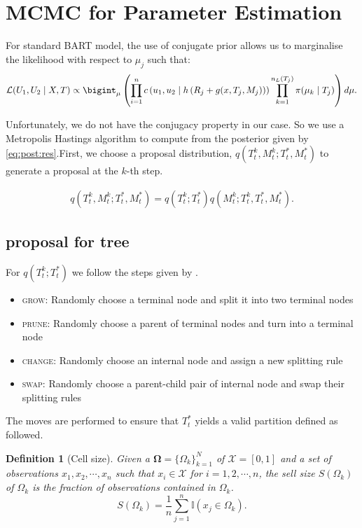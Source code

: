 \documentclass{amsart}
\newtheorem{definition}{Definition}[section]
\begin{document}
\section{MCMC for Parameter Estimation}
For standard BART model, the use of conjugate prior allows us to marginalise the likelihood with respect to $\mu_j$ such that:
\begin{equation}
	\mathcal{L}(U_1,U_2\mid X, T)\propto \bigint_{\mu}\left(\prod_{i=1}^{n}c\left(u_{1},u_{2}\mid h\left(R_j+g(x, T_j, M_j)\right)\right)\prod_{k=1}^{n_L(T_j)}\pi(\mu_k\mid T_j)\right)d\mu.
\end{equation}

Unfortunately, we do not have the conjugacy property in our case. So we use a Metropolis Hastings algorithm to compute from the posterior given by \cref{eq:post:res}.First, we choose a proposal distribution, $q\left(T_t^k,M_t^k;T_t^\ast, M_t^\ast\right)$ to generate a proposal at the $k$-th step.

\begin{align}\label{eq:prop}
	q\left(T_t^k,M_t^k;T_t^\ast, M_t^\ast\right) = q\left(T_t^k;T_t^\ast\right) q\left(M_t^k;T_t^k, T_t^\ast, M_t^\ast\right).
\end{align}

\subsection{proposal for tree}
For $q\left(T_t^k;T_t^\ast\right)$ we follow the steps given by \citet{serafini2024lossbasedpriortreetopologies}. 

\begin{itemize}
	\item \textsc{grow}: Randomly choose a terminal node and split it into two terminal nodes
	\item \textsc{prune}: Randomly choose a parent of terminal nodes and turn into a terminal node
	\item \textsc{change}: Randomly choose an internal node and assign a new splitting rule
	\item \textsc{swap}: Randomly choose a parent-child pair of internal node and swap their splitting rules
\end{itemize}

The moves are performed to ensure that $T_t^\ast$ yields a valid partition defined as followed.

\begin{definition}[Cell size] Given a $\mathbf{\Omega} = \{\Omega_k\}_{k=1}^N$ of $\mathcal{X} = [0,1]$ and a set of observations $x_1, x_2, \cdots, x_n$ such that $x_i\in \mathcal{X}$ for $i=1,2,\cdots, n$, the sell size $S(\Omega_k)$ of $\Omega_k$
	is the fraction of observations contained in $\Omega_k$.
	\begin{equation*}
		S(\Omega_k) = \frac{1}{n}\sum_{j=1}^n \mathbb{I}(x_j\in \Omega_k).
	\end{equation*}
\end{definition}
\end{document}
